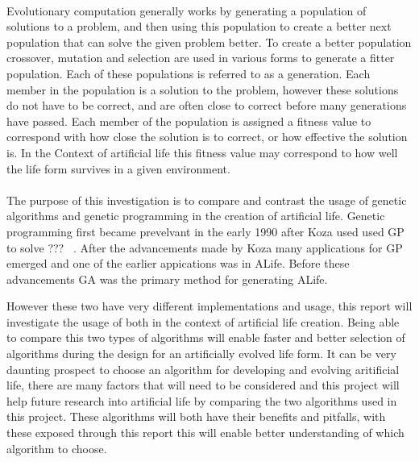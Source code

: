\documentclass[12pt]{article}
\begin{document}
\paragraph{}
Evolutionary computation generally works by generating a population of solutions to a problem, and then using this population to create a better next population that can solve the given problem better.
To create a better population crossover, mutation and selection are used in various forms to generate a fitter population.
Each of these populations is referred to as a generation.
Each member in the population is a solution to the problem, however these solutions do not have to be correct, and are often close to correct before many generations have passed.
Each member of the population is assigned a fitness value to correspond with how close the solution is to correct, or how effective the solution is.
In the Context of artificial life this fitness value may correspond to how well the life form survives in a given environment.

\paragraph{}
The purpose of this investigation is to compare and contrast the usage of genetic algorithms and genetic programming in the creation of artificial life. Genetic programming first became prevelvant in the early 1990 after Koza used used GP to solve ??? ~\cite{Koza90}. After the advancements made by Koza many applications for GP emerged and one of the earlier appications was in ALife. Before these advancements GA was the primary method for generating ALife.

However these two have very different implementations and usage, this report will investigate the usage of both in the context of artificial life creation. 
Being able to compare this two types of algorithms will enable faster and better selection of algorithms during 
the design for an artificially evolved life form. It can be very daunting prospect to choose an algorithm
for developing and evolving aritificial life, there are many factors that will need to be considered and this
project will help future research into artificial life by comparing the two algorithms used in this project.
These algorithms will both have their benefits and pitfalls, with these exposed through this report this 
will enable better understanding of which algorithm to choose.
\end{document}
